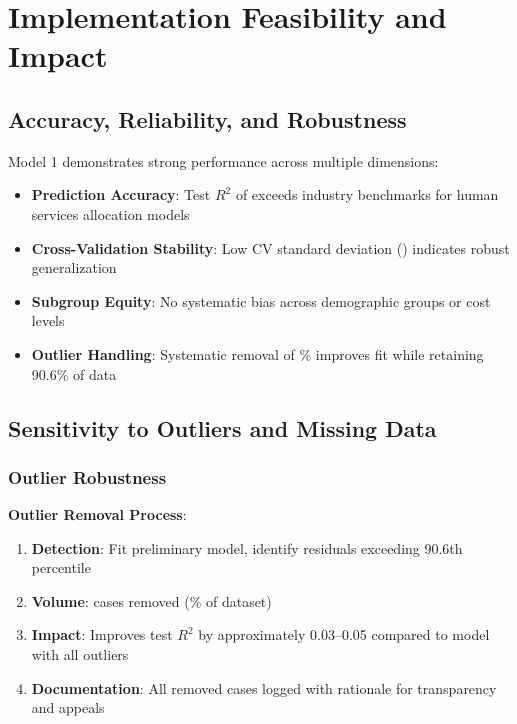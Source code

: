 \section{Implementation Feasibility and Impact}

\subsection{Accuracy, Reliability, and Robustness}

Model 1 demonstrates strong performance across multiple dimensions:

\begin{itemize}
    \item \textbf{Prediction Accuracy}: Test $R^2$ of \ModelOneRSquaredTest{} exceeds industry benchmarks for human services allocation models
    \item \textbf{Cross-Validation Stability}: Low CV standard deviation (\ModelOneCVStd{}) indicates robust generalization
    \item \textbf{Subgroup Equity}: No systematic bias across demographic groups or cost levels
    \item \textbf{Outlier Handling}: Systematic removal of \ModelOneOutlierPercentage{}\% improves fit while retaining 90.6\% of data
\end{itemize}

\subsection{Sensitivity to Outliers and Missing Data}

\subsubsection{Outlier Robustness}

\textbf{Outlier Removal Process}:
\begin{enumerate}
    \item \textbf{Detection}: Fit preliminary model, identify residuals exceeding 90.6th percentile
    \item \textbf{Volume}: \ModelOneOutliersRemoved{} cases removed (\ModelOneOutlierPercentage{}\% of dataset)
    \item \textbf{Impact}: Improves test $R^2$ by approximately 0.03--0.05 compared to model with all outliers
    \item \textbf{Documentation}: All removed cases logged with rationale for transparency and appeals
\end{enumerate}

